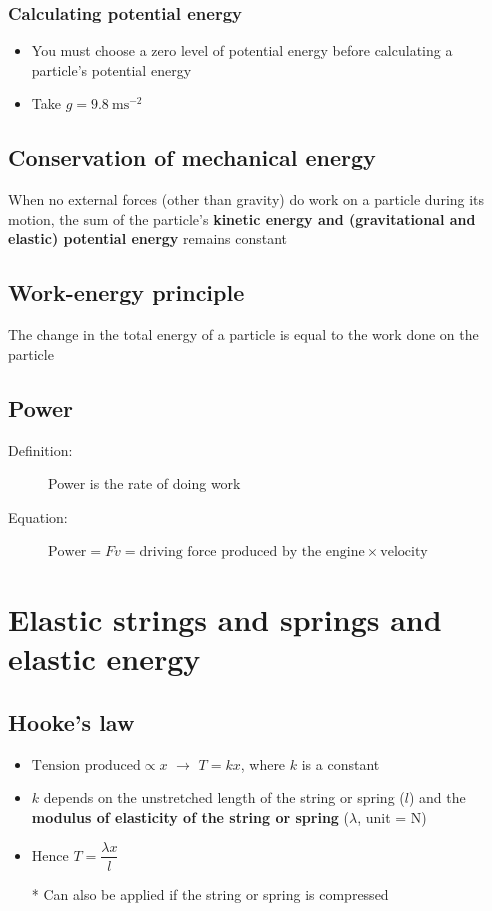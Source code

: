 \documentclass[11pt, A4paper]{article}
\begin{document}
	\subsubsection{Calculating potential energy}
	\begin{itemize}
		\item You must choose a zero level of potential energy before calculating a particle's potential energy
		\item Take $g=9.8 \: \text{ms}^{-2}$
	\end{itemize}
	
	
	\subsection{Conservation of mechanical energy}
	When no external forces (other than gravity) do work on a particle during its motion, the sum of the particle's \textbf{kinetic energy and (gravitational and elastic) potential energy} remains constant
	
	\subsection{Work-energy principle}
	The change in the total energy of a particle is equal to the work done on the particle
	
	\subsection{Power}
	\begin{description}
		\item[Definition:] Power is the rate of doing work
		\item[Equation:] $\text{Power}=Fv=\text{driving force produced by the engine}\times\text{velocity}$
	\end{description}
	
	\section[3 Elastic strings and springs and elastic energy]{Elastic strings and springs and elastic energy}
	\subsection{Hooke's law}
	\begin{itemize}
		\item $\text{Tension produced}\propto x$ $\rightarrow$ $T=kx$, where $k$ is a constant
		\item $k$ depends on the unstretched length of the string or spring ($l$) and the \textbf{modulus of elasticity of the string or spring} ($\lambda$, unit = N)
		\item Hence $T=\dfrac{\lambda x}{l}$
		\item[*] Can also be applied if the string or spring is compressed
	\end{itemize}
	
\end{document}
